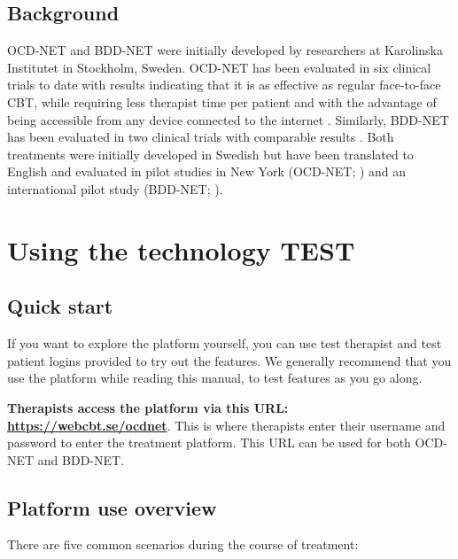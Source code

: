 \documentclass[]{book}
\begin{document}
\hypertarget{background}{%
\section{Background}\label{background}}

OCD-NET and BDD-NET were initially developed by researchers at Karolinska Institutet in Stockholm, Sweden. OCD-NET has been evaluated in six clinical trials to date with results indicating that it is as effective as regular face-to-face CBT, while requiring less therapist time per patient and with the advantage of being accessible from any device connected to the internet \citep{andersson2011, andersson2012, andersson2014, andersson2015, ruck2018}. Similarly, BDD-NET has been evaluated in two clinical trials with comparable results \citep{enander2014, enander2016, enander2019}. Both treatments were initially developed in Swedish but have been translated to English and evaluated in pilot studies in New York (OCD-NET; \citet{patel2017}) and an international pilot study (BDD-NET; \citet{gentile2019}).

\hypertarget{using-the-technology-test}{%
\chapter{Using the technology TEST}\label{using-the-technology-test}}

\hypertarget{quick-start}{%
\section{Quick start}\label{quick-start}}

If you want to explore the platform yourself, you can use test therapist and test patient logins provided to try out the features. We generally recommend that you use the platform while reading this manual, to test features as you go along.

\textbf{Therapists access the platform via this URL: \url{https://webcbt.se/ocdnet}}. This is where therapists enter their username and password to enter the treatment platform. This URL can be used for both OCD-NET and BDD-NET.

\hypertarget{platform-use-overview}{%
\section{Platform use overview}\label{platform-use-overview}}

There are five common scenarios during the course of treatment:
\end{document}
